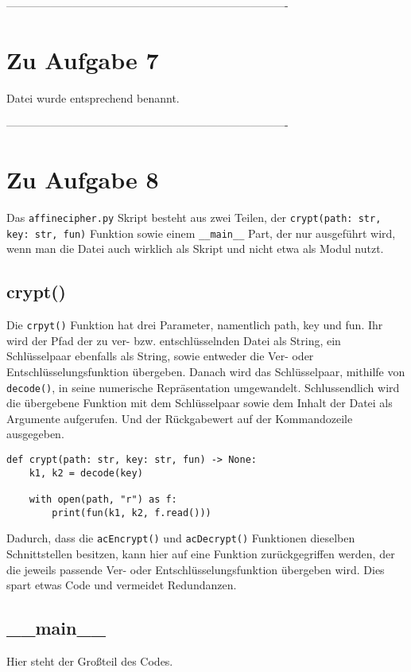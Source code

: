 \documentclass[12pt]{article}
\begin{document}
%
 ----------------------------------------------------------------------------
\section{Zu Aufgabe 7}
Datei wurde entsprechend benannt.

%
 ----------------------------------------------------------------------------
\section{Zu Aufgabe 8}
Das \texttt{affinecipher.py} Skript besteht aus zwei Teilen, der \texttt{crypt(path: str, key: str, fun)} Funktion sowie einem \texttt{\_\_main\_\_} Part, der nur ausgeführt wird, wenn man die Datei auch wirklich als Skript und nicht etwa als Modul nutzt.

\subsection{crypt()}
Die \texttt{crpyt()} Funktion hat drei Parameter, namentlich path, key und fun. Ihr wird der Pfad der zu ver- bzw. entschlüsselnden Datei als String, ein Schlüsselpaar ebenfalls als String, sowie entweder die Ver- oder Entschlüsselungsfunktion übergeben. Danach wird das Schlüsselpaar, mithilfe von \texttt{decode()}, in seine numerische Repräsentation umgewandelt. Schlussendlich wird die übergebene Funktion mit dem Schlüsselpaar sowie dem Inhalt der Datei als Argumente aufgerufen. Und der Rückgabewert auf der Kommandozeile ausgegeben.
\begin{lstlisting}
def crypt(path: str, key: str, fun) -> None:
    k1, k2 = decode(key)

    with open(path, "r") as f:
        print(fun(k1, k2, f.read()))

\end{lstlisting}
Dadurch, dass die \texttt{acEncrypt()} und \texttt{acDecrypt()} Funktionen dieselben Schnittstellen besitzen, kann hier auf eine Funktion zurückgegriffen werden, der die jeweils passende Ver- oder Entschlüsselungsfunktion übergeben wird. Dies spart etwas Code und vermeidet Redundanzen.

\subsection{\_\_main\_\_}
Hier steht der Großteil des Codes. 
\end{document}
